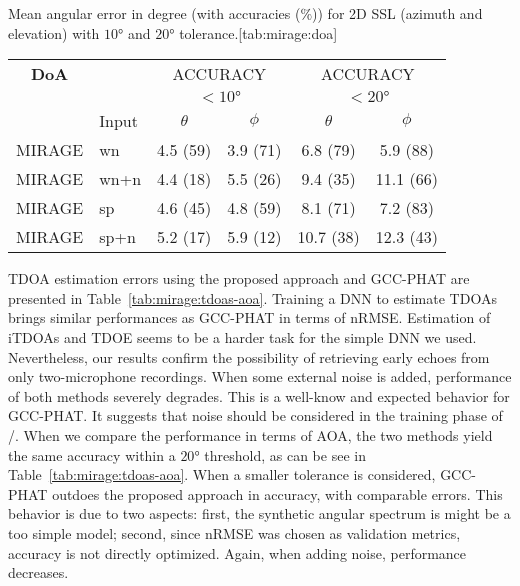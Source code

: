 \begin{table}[ht]
\begin{sidecaption}{%
    Mean angular error in degree (with accuracies ($\%$)) for 2D SSL (azimuth and elevation)
    with $\ang{10}$ and $\ang{20}$ tolerance.}[tab:mirage:doa]
    \footnotesize
    \centering
    \begin{tabular}{cl|cc|cc}
    \toprule
    \textbf{DoA}    &            &  \multicolumn{2}{c|}{ACCURACY}    &   \multicolumn{2}{c}{ACCURACY} \\
                    &            &  \multicolumn{2}{c|}{$<\ang{10}$} &   \multicolumn{2}{c}{$<\ang{20}$} \\
                    &    Input   &  $\theta$ &  $\phi$ &  $\theta$ &  $\phi$ \\
    \midrule
    MIRAGE &  wn    &   4.5 (59) &  3.9 (71) &   6.8 (79) &   5.9 (88) \\
    MIRAGE &  wn+n  &   4.4 (18) &  5.5 (26) &   9.4 (35) &  11.1 (66) \\
    MIRAGE &  sp    &   4.6 (45) &  4.8 (59) &   8.1 (71) &   7.2 (83) \\
    MIRAGE &  sp+n  &   5.2 (17) &  5.9 (12) &  10.7 (38) &  12.3 (43) \\
    \bottomrule
    \end{tabular}
\end{sidecaption}
\end{table}

\ac{TDOA} estimation errors using the proposed approach and \ac{GCC-PHAT} are presented in Table~\cref{tab:mirage:tdoas-aoa}.
Training a \ac{DNN} to estimate \acp{TDOA} brings similar performances as \ac{GCC-PHAT} in terms of \ac{nRMSE}.
Estimation of \acp{iTDOA} and \ac{TDOE} seems to be a harder task for the simple \ac{DNN} we used.
Nevertheless, our results confirm the possibility of retrieving early echoes from only two-microphone recordings.
When some external noise is added, performance of both methods severely degrades.
This is a well-know and expected behavior for \ac{GCC-PHAT}.
It suggests that noise should be considered in the training phase of \MIRAGE/.
When we compare the performance in terms of \ac{AOA}, the two methods yield the same accuracy within a $\ang{20}$ threshold, as can be see in Table~\cref{tab:mirage:tdoas-aoa}.
When a smaller tolerance is considered, GCC-PHAT outdoes the proposed approach in accuracy, with comparable errors.
This behavior is due to two aspects: first, the synthetic angular spectrum is might be a too simple model; second, since \ac{nRMSE} was chosen as validation metrics, accuracy is not directly optimized.
Again, when adding noise, performance decreases.

